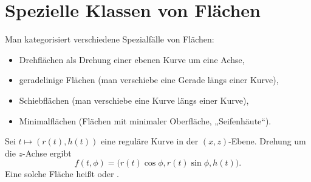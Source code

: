 \chapter{Spezielle Klassen von Flächen}



Man kategorisiert verschiedene Spezialfälle von Flächen:
\begin{itemize}
	\item
		Drehflächen als Drehung einer ebenen Kurve um eine Achse,
	\item
		geradelinige Flächen (man verschiebe eine Gerade längs einer Kurve),
	\item
		Schiebflächen (man verschiebe eine Kurve längs einer Kurve),
	\item
		Minimalflächen (Flächen mit minimaler Oberfläche, „Seifenhäute“).
\end{itemize}

\begin{df}[Drehfläche]
	Sei $t \mapsto (r(t), h(t))$ eine reguläre Kurve in der $(x,z)$-Ebene.
	Drehung um die $z$-Achse ergibt
	\[
		f(t, \phi) = \big( r(t) \cos \phi, r(t) \sin \phi, h(t) \big).
	\]
	Eine solche Fläche heißt  oder .
\end{df}

